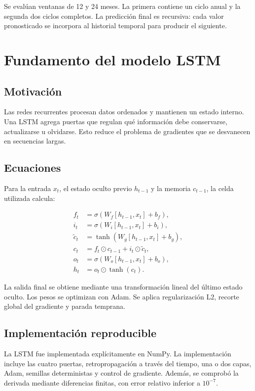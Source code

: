 \documentclass[11pt,letterpaper]{article}
\begin{document}
Se evalúan ventanas de 12 y 24 meses. La primera contiene un ciclo anual y la
segunda dos ciclos completos. La predicción final es recursiva: cada valor
pronosticado se incorpora al historial temporal para producir el siguiente.

\section{Fundamento del modelo LSTM}

\subsection{Motivación}

Las redes recurrentes procesan datos ordenados y mantienen un estado interno.
Una LSTM agrega puertas que regulan qué información debe conservarse,
actualizarse u olvidarse. Esto reduce el problema de gradientes que se
desvanecen en secuencias largas.

\subsection{Ecuaciones}

Para la entrada \(x_t\), el estado oculto previo \(h_{t-1}\) y la memoria
\(c_{t-1}\), la celda utilizada calcula:

\begin{align}
f_t &= \sigma(W_f[h_{t-1},x_t]+b_f),\\
i_t &= \sigma(W_i[h_{t-1},x_t]+b_i),\\
\widetilde{c}_t &= \tanh(W_g[h_{t-1},x_t]+b_g),\\
c_t &= f_t\odot c_{t-1}+i_t\odot\widetilde{c}_t,\\
o_t &= \sigma(W_o[h_{t-1},x_t]+b_o),\\
h_t &= o_t\odot\tanh(c_t).
\end{align}

La salida final se obtiene mediante una transformación lineal del último
estado oculto. Los pesos se optimizan con Adam. Se aplica regularización L2,
recorte global del gradiente y parada temprana.

\subsection{Implementación reproducible}

La LSTM fue implementada explícitamente en NumPy. La implementación incluye
las cuatro puertas, retropropagación a través del tiempo, una o dos capas,
Adam, semillas deterministas y control de gradiente. Además, se comprobó la
derivada mediante diferencias finitas, con error relativo inferior a
\(10^{-7}\).
\end{document}
